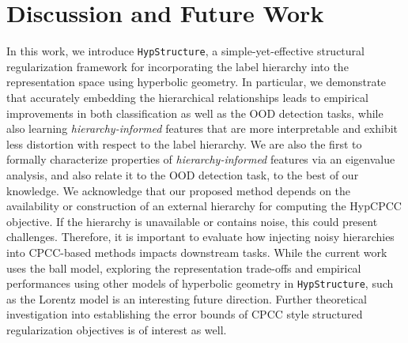 \section{Discussion and Future Work}
\label{sec:disc}

In this work, we introduce \texttt{HypStructure}, a simple-yet-effective structural regularization framework for incorporating the label hierarchy into the representation space using hyperbolic geometry. In particular, we demonstrate that accurately embedding the hierarchical relationships leads to empirical improvements in both classification as well as the OOD detection tasks, while also learning \emph{hierarchy-informed} features that are more interpretable and exhibit less distortion with respect to the label hierarchy. We are also the first to formally characterize properties of \emph{hierarchy-informed} features via an eigenvalue analysis, and also relate it to the OOD detection task, to the best of our knowledge. We acknowledge that our proposed method depends on the availability or construction of an external hierarchy for computing the HypCPCC objective. If the hierarchy is unavailable or contains noise, this could present challenges. Therefore, it is important to evaluate how injecting noisy hierarchies into CPCC-based methods impacts downstream tasks. While the current work uses the \Poincare ball model, exploring the representation trade-offs and empirical performances using other models of hyperbolic geometry in \texttt{HypStructure}, such as the Lorentz model \citep{nickel2018learning} is an interesting future direction. Further theoretical investigation into establishing the error bounds of CPCC style structured regularization objectives is of interest as well.